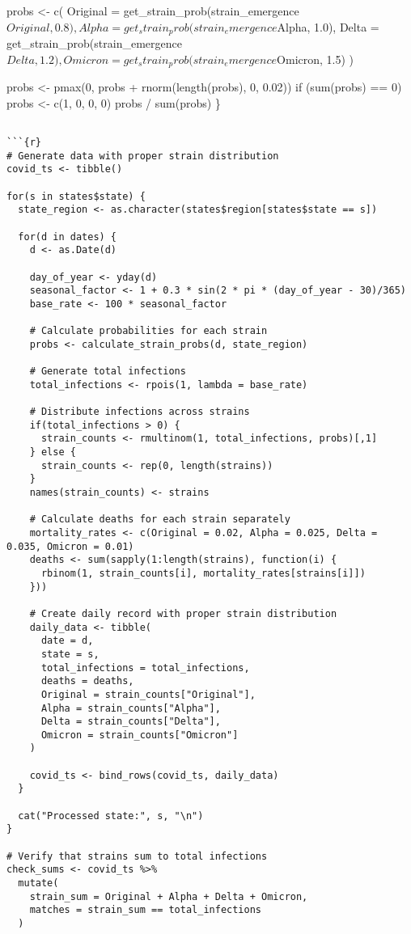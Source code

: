 \documentclass[
]{article}
\begin{document}
probs \textless- c( Original =
get\_strain\_prob(strain\_emergence\(Original, 0.8),
    Alpha = get_strain_prob(strain_emergence\)Alpha, 1.0), Delta =
get\_strain\_prob(strain\_emergence\(Delta, 1.2),
    Omicron = get_strain_prob(strain_emergence\)Omicron, 1.5) )

probs \textless- pmax(0, probs + rnorm(length(probs), 0, 0.02)) if
(sum(probs) == 0) probs \textless- c(1, 0, 0, 0) probs / sum(probs) \}

\begin{verbatim}

```{r}
# Generate data with proper strain distribution
covid_ts <- tibble()

for(s in states$state) {
  state_region <- as.character(states$region[states$state == s])
  
  for(d in dates) {
    d <- as.Date(d)
    
    day_of_year <- yday(d)
    seasonal_factor <- 1 + 0.3 * sin(2 * pi * (day_of_year - 30)/365)
    base_rate <- 100 * seasonal_factor
    
    # Calculate probabilities for each strain
    probs <- calculate_strain_probs(d, state_region)
    
    # Generate total infections
    total_infections <- rpois(1, lambda = base_rate)
    
    # Distribute infections across strains
    if(total_infections > 0) {
      strain_counts <- rmultinom(1, total_infections, probs)[,1]
    } else {
      strain_counts <- rep(0, length(strains))
    }
    names(strain_counts) <- strains
    
    # Calculate deaths for each strain separately
    mortality_rates <- c(Original = 0.02, Alpha = 0.025, Delta = 0.035, Omicron = 0.01)
    deaths <- sum(sapply(1:length(strains), function(i) {
      rbinom(1, strain_counts[i], mortality_rates[strains[i]])
    }))
    
    # Create daily record with proper strain distribution
    daily_data <- tibble(
      date = d,
      state = s,
      total_infections = total_infections,
      deaths = deaths,
      Original = strain_counts["Original"],
      Alpha = strain_counts["Alpha"],
      Delta = strain_counts["Delta"],
      Omicron = strain_counts["Omicron"]
    )
    
    covid_ts <- bind_rows(covid_ts, daily_data)
  }
  
  cat("Processed state:", s, "\n")
}

# Verify that strains sum to total infections
check_sums <- covid_ts %>%
  mutate(
    strain_sum = Original + Alpha + Delta + Omicron,
    matches = strain_sum == total_infections
  )
\end{verbatim}
\end{document}
